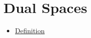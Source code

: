 \documentclass{article}
\begin{document}
\section*{Dual Spaces}

\begin{itemize}
\item \href{s01.html}{Definition}
\end{itemize}
\end{document}
